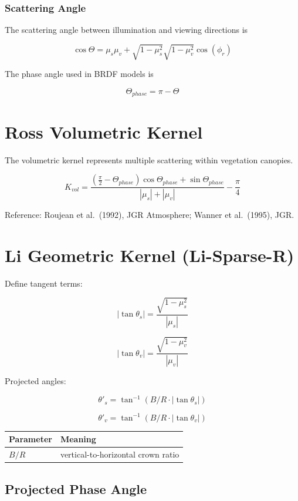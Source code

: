 \documentclass[
  11pt,
  letterpaper,
  DIV=11,
  numbers=noendperiod]{scrreprt}
\begin{document}
\subsubsection{Scattering Angle}\label{scattering-angle}

The scattering angle between illumination and viewing directions is

\[
\cos\Theta =
\mu_s\mu_v +
\sqrt{1-\mu_s^2}\sqrt{1-\mu_v^2}\cos(\phi_r)
\]

The phase angle used in BRDF models is

\[
\Theta_{phase} = \pi - \Theta
\]

\section{Ross Volumetric Kernel}\label{ross-volumetric-kernel}

The volumetric kernel represents multiple scattering within vegetation
canopies.

\[
K_{vol} =
\frac{\left(\frac{\pi}{2}-\Theta_{phase}\right)\cos\Theta_{phase} + \sin\Theta_{phase}}
{|\mu_s| + |\mu_v|}-\frac{\pi}{4}
\]

Reference: Roujean et al.~(1992), JGR Atmosphere; Wanner et al.~(1995),
JGR.

\section{Li Geometric Kernel
(Li-Sparse-R)}\label{li-geometric-kernel-li-sparse-r}

Define tangent terms:

\[
|\tan\theta_s| = \frac{\sqrt{1-\mu_s^2}}{|\mu_s|}
\]

\[
|\tan\theta_v| = \frac{\sqrt{1-\mu_v^2}}{|\mu_v|}
\]

Projected angles:

\[
\theta'_s = \tan^{-1}(B/R \cdot |\tan\theta_s|)
\]

\[
\theta'_v = \tan^{-1}(B/R \cdot |\tan\theta_v|)
\]

\begin{longtable}[]{@{}ll@{}}
\toprule\noalign{}
Parameter & Meaning \\
\midrule\noalign{}
\endhead
\bottomrule\noalign{}
\endlastfoot
\(B/R\) & vertical-to-horizontal crown ratio \\
\end{longtable}

\subsection{Projected Phase Angle}\label{projected-phase-angle}
\end{document}
